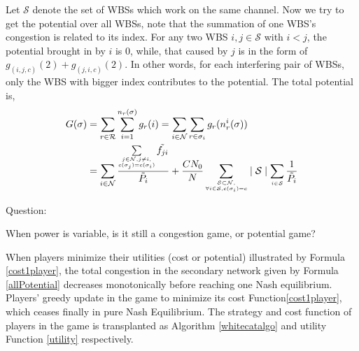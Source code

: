 Let $\mathcal{S}$ denote the set of WBSs which work on the same channel.
Now we try to get the potential over all WBSs, note that the summation of one WBS's congestion is related to its index. For any two WBS $i,j\in \mathcal{S}$ with $i<j$, the potential brought in by $i$ is 0, while, that caused by $j$ is in the form of $g_{(i,j,c)}(2)+g_{(j,i,c)}(2)$. In other words, for each interfering pair of WBSs, only the WBS with bigger index contributes to the potential. The total potential is, 
\begin{equation}
\label{allPotential}
\begin{split}	
G(\sigma) 
& =\sum\limits^{}_{r\in \mathcal{R}} \sum\limits^{n_r(\sigma)}_{i=1} g_r(i)  =\sum\limits_{i\in \mathcal{N}} \sum\limits^{}_{r\in \sigma_i} g_r(n_r^i(\sigma))\\
& = \sum\limits_{i\in \mathcal{N}}\dfrac{\sum\limits_{\tiny\substack{j\in \mathcal{N}, j\ne i,\\ c(\sigma_j)=c(\sigma_i)}}\tilde{f_{ji}}}{\tilde{P_i}} + \dfrac{CN_0}{N}\sum\limits_{\tiny\substack{\mathcal{S}\subset \mathcal{N},\\ \forall i\in \mathcal{S}, c(\sigma_i)=c}} \mid \mathcal{S}\mid   \sum\limits_{\tiny\substack{i\in \mathcal{S}}}\frac{1}{\tilde{P_i}}
\end{split}
\end{equation}



Question:

When power is variable, is it still a congestion game, or potential game?

When players minimize their utilities (cost or potential) illustrated by Formula \ref{cost1player}, the total congestion in the secondary network given by Formula \ref{allPotential} decreases monotonically before reaching one Nash equilibrium. Players' greedy update in the game to minimize its cost Function\ref{cost1player}, which ceases finally in pure Nash Equilibrium. The strategy and cost function of players in the game is transplanted as Algorithm \ref{whitecatalgo} and utility Function \ref{utility} respectively.

